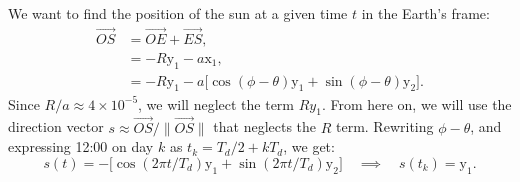 \documentclass[12pt]{article}
\begin{document}
We want to find the position of the sun at a given time $t$ in the Earth's 
frame:
\begin{equation}
    \begin{aligned}
        \overrightarrow{OS} &= \overrightarrow{OE} + \overrightarrow{ES},\\
        &= -R \mathrm{y}_1 - a \mathrm{x}_1,\\
        &= -R \mathrm{y}_1 - a \Big[\cos(\phi-\theta) \mathrm{y}_1 + \sin(\phi-\theta) \mathrm{y}_2\Big].
    \end{aligned}
\end{equation}
Since $R/a \approx 4\times 10^{-5}$, we will neglect the term $R y_1$.
From here on, we will use the direction vector 
$s\approx \overrightarrow{OS}/\|\overrightarrow{OS}\|$ that neglects
the $R$ term. Rewriting $\phi-\theta$, and expressing 12:00 on day $k$ 
as $t_{k}=T_d/2 + kT_d$, we get:
\begin{equation}
    s(t) = -\Big[\cos(2\pi t/T_d) \mathrm{y}_1 + \sin(2\pi t/T_d) \mathrm{y}_2\Big]
    \quad \implies \quad s(t_{k}) = \mathrm{y}_1.
\end{equation}
\end{document}
